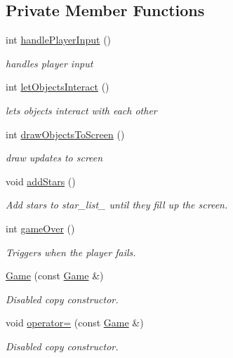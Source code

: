 \subsection*{Private Member Functions}
\begin{DoxyCompactItemize}
\item 
int \hyperlink{classGame_a882d8ea87fc0ee4bb827f1de818c8aa1}{handle\-Player\-Input} ()
\begin{DoxyCompactList}\small\item\em handles player input \end{DoxyCompactList}\item 
int \hyperlink{classGame_adcf97122d591ec030faf6125205a8a6e}{let\-Objects\-Interact} ()
\begin{DoxyCompactList}\small\item\em lets objects interact with each other \end{DoxyCompactList}\item 
int \hyperlink{classGame_a4fc66dc51ec497791258a8ab5263afe8}{draw\-Objects\-To\-Screen} ()
\begin{DoxyCompactList}\small\item\em draw updates to screen \end{DoxyCompactList}\item 
void \hyperlink{classGame_ac64e91bd895186e51ab2e1f23bcc5508}{add\-Stars} ()
\begin{DoxyCompactList}\small\item\em Add stars to star\-\_\-list\-\_\- until they fill up the screen. \end{DoxyCompactList}\item 
int \hyperlink{classGame_a98788d98f37433c3a4575c644c0540b9}{game\-Over} ()
\begin{DoxyCompactList}\small\item\em Triggers when the player fails. \end{DoxyCompactList}\item 
\hyperlink{classGame_aa79443880de5f26387c2a1c70c8c1aae}{Game} (const \hyperlink{classGame}{Game} \&)
\begin{DoxyCompactList}\small\item\em Disabled copy constructor. \end{DoxyCompactList}\item 
void \hyperlink{classGame_a33d46168923cdeca0d97553fc47e050e}{operator=} (const \hyperlink{classGame}{Game} \&)
\begin{DoxyCompactList}\small\item\em Disabled copy constructor. \end{DoxyCompactList}\end{DoxyCompactItemize}
